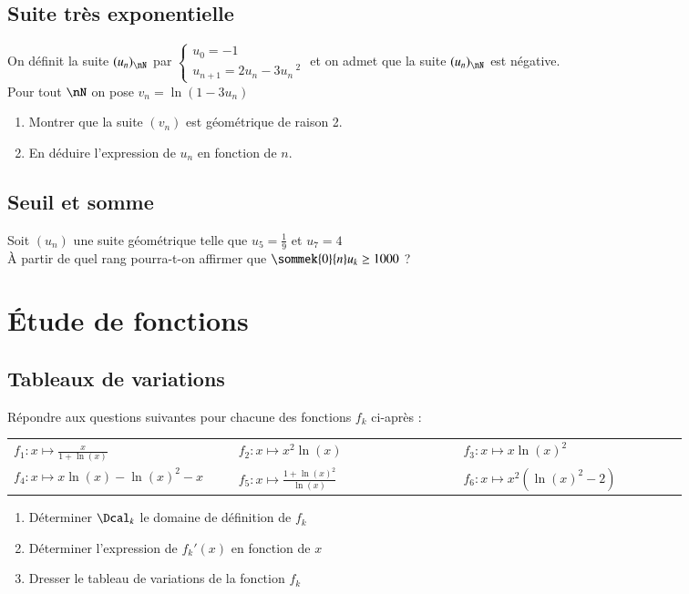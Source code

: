 \documentclass[oneside,12pt]{article}          %
\begin{document}
\subsection{Suite très exponentielle}
On définit la suite $(u_n)_{\nN}$ par $\begin{cases}u_0=-1\\u_{n+1}=2u_n-3u_n\,^2\end{cases}$ et on admet que la suite $(u_n)_{\nN}$ est négative. \\
Pour tout $\nN$ on pose $v_n=\ln(1-3u_n)$
\begin{enumerate}
	\item Montrer que la suite $(v_n)$ est géométrique de raison 2.
	\item En déduire l'expression de $u_n$ en fonction de $n$.
\end{enumerate}



\subsection{Seuil et somme}
Soit $(u_n)$ une suite géométrique telle que $u_5=\frac{1}{9}$ et $u_7=4$\\
À partir de quel rang pourra-t-on affirmer que $\sommek{0}{n}u_k \geq 1000$ ?



\section{Étude de fonctions}

\subsection{Tableaux de variations}
Répondre aux questions suivantes pour chacune des fonctions $f_k$ ci-après :

\renewcommand{\arraystretch}{1.5}
\begin{tabular}{p{0.3\linewidth} p{0.3\linewidth} p{0.3\linewidth}}
	$f_1:x\mapsto \frac{x}{1+\ln(x)}$ & $f_2:x\mapsto x^2\ln(x) $ & $f_3:x\mapsto x\ln(x)^2$ \\
	$f_4:x\mapsto x\ln(x)-\ln(x)^2-x$ & $f_5:x\mapsto \frac{1+\ln(x)^2}{\ln(x)}$ & $f_6:x\mapsto x^2\left(\ln(x)^2-2\right) $
\end{tabular}
\begin{enumerate}
	\item Déterminer $\Dcal_k$ le domaine de définition de $f_k$
	\item Déterminer l'expression de ${f_k}'(x)$ en fonction de $x$
	\item Dresser le tableau de variations de la fonction $f_k$
\end{enumerate}
\end{document}
